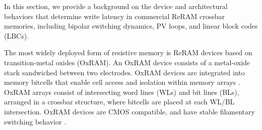 \label{sec:bg}
In this section, we provide a background on the device and architectural behaviors that determine write latency in commercial ReRAM crossbar memories, including bipolar switching dynamics, PV loops, and linear block codes (LBCs). %

\label{sec:oxram-xbar}
The most widely deployed form of resistive memory is ReRAM devices based on transition-metal oxides (OxRAM).
An OxRAM device consists of a metal-oxide stack sandwiched between two electrodes. OxRAM devices are integrated into memory bitcells that enable cell access and isolation within memory arrays \cite{yu2016resistive}. OxRAM arrays consist of intersecting word lines (WLs) and bit lines (BLs), arranged in a crossbar structure, where bitcells are placed at each WL/BL intersection.
OxRAM devices are CMOS compatible, and have stable filamentary switching behavior \cite{chen2020reram, ielmini2025resistive}.

